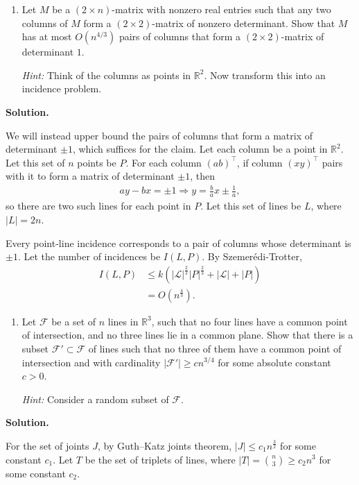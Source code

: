 \documentclass[11pt,letterpaper]{article}
\theoremstyle{definition}
\newcommand{\reals}{\mathbb{R}}
\newcommand{\calF}{\mathcal{F}}
\newcommand{\calL}{\mathcal{L}}
\newcommand{\solution}{\medskip\noindent\textbf{Solution.}\par\medskip}
\begin{document}
\begin{enumerate}[resume=q]
\item Let $M$ be a $(2 \times n)$-matrix with nonzero real entries such that any two columns of $M$ form a $(2 \times 2)$-matrix of nonzero determinant. Show that $M$ has at most $O(n^{4/3})$ pairs of columns that form a $(2 \times 2)$-matrix of determinant $1$.

\emph{Hint:} Think of the columns as points in $\mathbb{R}^2$. Now transform this into an incidence problem.
\end{enumerate}

\solution
We will instead upper bound the pairs of columns that form a matrix of determinant $\pm 1$, which suffices for the claim.
Let each column be a point in $\reals^2$. 
Let this set of $n$ points be $P$.
For each column $(a b)^\top$, if column $(x y)^\top$ pairs with it to form a matrix of determinant $\pm 1$, then
\begin{align*}
    ay-bx = \pm 1 \Rightarrow y = \frac{b}{a}x \pm \frac{1}{a},
\end{align*}
so there are two such lines for each point in $P$.
Let this set of lines be $L$, where $|L|=2n$.

Every point-line incidence corresponds to a pair of columns whose determinant is $\pm1$.
Let the number of incidences be $I(L,P)$.
By Szemer\'edi-Trotter,
\begin{align*}
    I(L,P) &\leq k(|\calL|^\frac{2}{3}|P|^\frac{2}{3}+|\calL|+|P|)\\
        &=O(n^\frac{4}{3}).
\end{align*}

\begin{enumerate}[resume=q]
\item Let $\calF$ be a set of $n$ lines in $\mathbb{R}^3$, such that no four lines have a common point of intersection, and no three lines lie in a common plane. Show that there is a subset $\calF' \subset \calF$ of lines such that no three of them have a common point of intersection and with cardinality $|\calF'| \geq cn^{3/4}$ for some absolute constant $c > 0$.

\emph{Hint:} Consider a random subset of $\calF$.
\end{enumerate}

\solution

For the set of joints $J$, by Guth–Katz joints theorem, $|J|\leq c_1n^\frac{3}{2}$ for some constant $c_1$.
Let $T$ be the set of triplets of lines, where $|T| =\binom{n}{3}\geq c_2n^3$ for some constant $c_2$.
\end{document}
